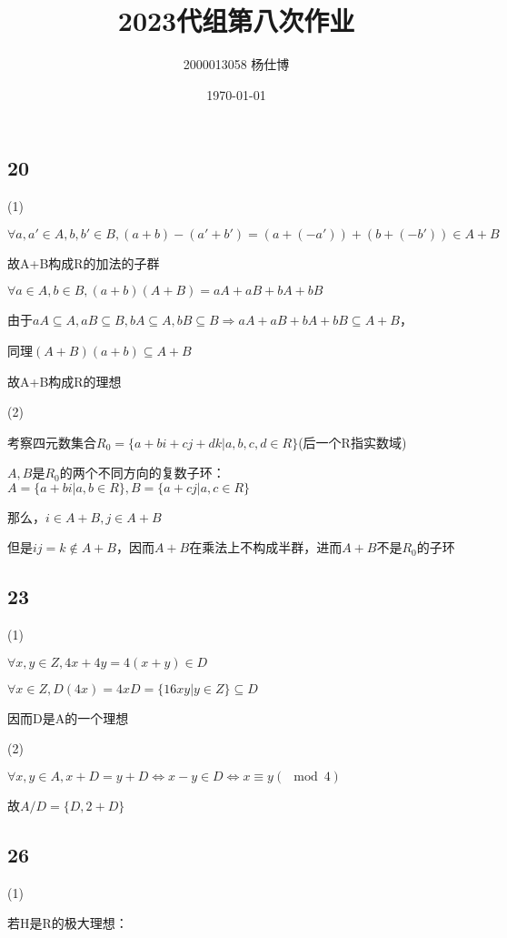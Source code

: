 \documentclass[UTF8]{ctexart}
\title{\vspace{-4cm}2023代组第八次作业}
\author{2000013058 杨仕博}
\date{\today}
\begin{document}
\maketitle

\subsection*{20}

(1)

$\forall a, a'\in A, b, b'\in B, (a + b) - (a' + b') = (a + (-a')) + (b + (-b'))\in A + B$

故A+B构成R的加法的子群

$\forall a\in A, b\in B, (a + b)(A + B) = aA + aB + bA + bB$

由于$aA\subseteq A, aB\subseteq B, bA\subseteq A, bB\subseteq B\Rightarrow aA + aB + bA + bB\subseteq A + B$，

同理$(A + B)(a + b)\subseteq A + B$

故A+B构成R的理想

(2)

考察四元数集合$R_0 = \{a + bi + cj + dk | a, b, c, d\in R\}$(后一个R指实数域)

$A, B$是$R_0$的两个不同方向的复数子环：$A = \{a + bi | a, b\in R\}, B = \{a + cj | a, c\in R\}$

那么，$i\in A + B, j\in A + B$

但是$ij = k \notin A + B$，因而$A + B$在乘法上不构成半群，进而$A + B$不是$R_0$的子环

\subsection*{23}

(1)

$\forall x, y\in Z, 4x + 4y = 4(x + y)\in D$

$\forall x\in Z, D(4x) = 4xD = \{16xy | y\in Z\}\subseteq D$

因而D是A的一个理想

(2)

$\forall x, y\in A, x + D = y + D\Leftrightarrow x - y\in D\Leftrightarrow x\equiv y (\mod 4)$

故$A / D = \{D, 2 + D\}$

\subsection*{26}

(1)

若H是R的极大理想：
\end{document}

